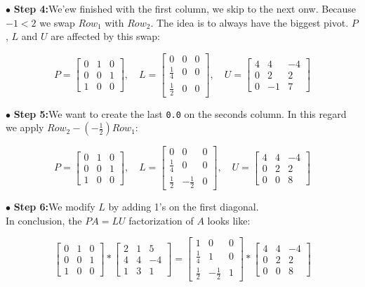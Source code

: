 $\bullet$ {\bf Step 4:}\quad We'ew finished with the first column, we skip to the next onw. Because $-1 < 2$ we swap $Row_1$ with $Row_2$. The idea is to always have the biggest pivot. $P$, $L$ and $U$ are affected by this swap:

$$
P=
\begin{bmatrix}
0 & 1 & 0 \\
0 & 0 & 1 \\
1 & 0 & 0 
\end{bmatrix}
, \quad
L =
\begin{bmatrix}
0 & 0 & 0 \\
\frac{1}{4} & 0 & 0 \\
\frac{1}{2} & 0 & 0 
\end{bmatrix}
, \quad 
U =
\begin{bmatrix}
4 & 4 & -4 \\
0 & 2 & 2  \\
0 & -1 & 7 
\end{bmatrix}
$$

$\bullet$ {\bf Step 5:}\quad We want to create the last {\tt 0.0} on the seconds column. In this regard we apply $Row_2 - \left(-\frac{1}{2}\right) Row_1$:

$$
P=
\begin{bmatrix}
0 & 1 & 0 \\
0 & 0 & 1 \\
1 & 0 & 0
\end{bmatrix}
, \quad 
L =
\begin{bmatrix}
0 & 0 & 0 \\
\frac{1}{4} & 0 & 0 \\
\frac{1}{2} & -\frac{1}{2} & 0
\end{bmatrix}
, \quad 
U =
\begin{bmatrix}
4 & 4 & -4 \\
0 & 2 & 2  \\
0 & 0 & 8
\end{bmatrix}
$$

$\bullet$ {\bf Step 6:}\quad We modify $L$ by adding 1's on the first diagonal.
\\

In conclusion, the $PA=LU$ factorization of $A$ looks like:

$$
\begin{bmatrix}
0 & 1 & 0 \\
0 & 0 & 1 \\
1 & 0 & 0
\end{bmatrix}
*
\begin{bmatrix}
2 & 1 & 5 \\
4 & 4 & -4 \\
1 & 3 & 1  
\end{bmatrix}
=
\begin{bmatrix}
1 & 0 & 0 \\
\frac{1}{4} & 1 & 0 \\
\frac{1}{2} & -\frac{1}{2} & 1
\end{bmatrix}
*
\begin{bmatrix}
4 & 4 & -4 \\
0 & 2 & 2  \\
0 & 0 & 8
\end{bmatrix}
$$

